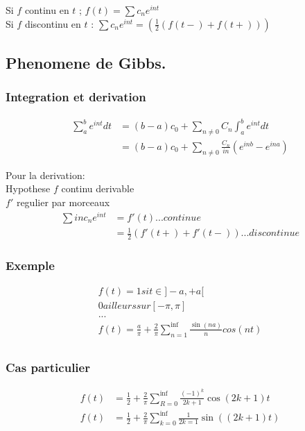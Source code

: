 \documentclass[a4paper,11pt]{article}
\begin{document}
Si $f$ continu en $t$ ; $f(t) = \sum c_{n} e^{int}$\\
Si $f$ discontinu en $t$ : $\sum c_n e^{int} = (\frac{1}{2} (f(t-) + f(t+)))$\\

\subsection{Phenomene de Gibbs.}

\subsubsection{Integration et derivation}
\begin{align*}
 \sum_a^b e^{int} dt &= (b - a) c_0 + \sum_{n \neq 0} C_n \int_a^b e^{int} dt\\
 &= (b - a) c_0 + \sum_{n \neq 0 } \frac{C_n}{in} (e^{inb} - e^{ina}) 
\end{align*}

Pour la derivation:\\
Hypothese $f$ continu derivable\\
$f'$ regulier par morceaux\\
\begin{align*}
  \sum inc_n e^{int} &= f'(t) ... continue\\
&=\frac{1}{2} (f'(t+)+ f'(t-)) ... discontinue
\end{align*}

\subsubsection{Exemple}

\begin{align*}
  f(t) = 1 si t \in ]-a, +a[\\
        0 ailleurs sur [-\pi,\pi]\\
        ...\\
        f(t) = \frac{a}{\pi} + \frac{2}{\pi} \sum_{n = 1}^{\inf} \frac{\sin(n a)}{n} cos(nt)\\
\end{align*}

\subsubsection{Cas particulier}
\begin{align*}
f(t) &= \frac{1}{2} + \frac{2}{\pi}\sum_{R = 0}^{\inf} \frac{(-1)^k}{2k + 1} \cos{(2k +1) }t  \\
f(t) &= \frac{1}{2} + \frac{2}{\pi} \sum_{k = 0}^{\inf} \frac{1}{2k =1} \sin((2k +1)t)\\
\end{align*}
\end{document}
